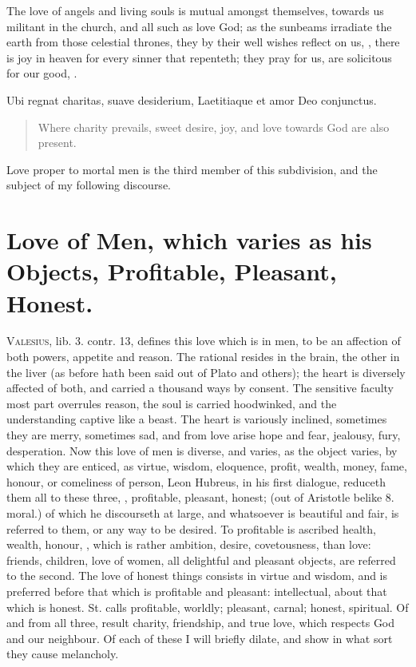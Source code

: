 {The love of angels and living souls is mutual amongst themselves,
towards us militant in the church, and all such as love God; as the
sunbeams irradiate the earth from those celestial thrones, they by
their well wishes reflect on us, , there is joy in heaven for every
sinner that repenteth; they pray for us, are solicitous for our good,
.

\begin{latin}
Ubi regnat charitas, suave desiderium,
Laetitiaque et amor Deo conjunctus.
\end{latin}
\translationrule%
\begin{verse}%
Where charity prevails, sweet desire,
joy, and love towards God are also present.
\end{verse}%

Love proper to mortal men is the third member of this subdivision, and
the subject of my following discourse.

\section[Love of Men]{Love of Men, which varies as his Objects, Profitable, Pleasant, Honest.}

\lettrine{V}{alesius}, lib. 3. contr. 13, defines this love which is in men, to be
an affection of both powers, appetite and reason. The rational
resides in the brain, the other in the liver (as before hath been said
out of Plato and others); the heart is diversely affected of both, and
carried a thousand ways by consent. The sensitive faculty most part
overrules reason, the soul is carried hoodwinked, and the understanding
captive like a beast. The heart is variously inclined, sometimes
they are merry, sometimes sad, and from love arise hope and fear,
jealousy, fury, desperation. Now this love of men is diverse, and
varies, as the object varies, by which they are enticed, as virtue,
wisdom, eloquence, profit, wealth, money, fame, honour, or comeliness
of person, \etc{} Leon Hubreus, in his first dialogue, reduceth them all
to these three, , profitable, pleasant,
honest; (out of Aristotle belike 8. moral.) of which he discourseth at
large, and whatsoever is beautiful and fair, is referred to them, or
any way to be desired. To profitable is ascribed health, wealth,
honour, \etc{}, which is rather ambition, desire, covetousness, than love:
friends, children, love of women, all delightful and pleasant
objects, are referred to the second. The love of honest things consists
in virtue and wisdom, and is preferred before that which is profitable
and pleasant: intellectual, about that which is honest. St.
\Austin{} calls profitable, worldly; pleasant, carnal; honest, spiritual.
Of and from all three, result charity, friendship, and true love,
which respects God and our neighbour. Of each of these I will briefly
dilate, and show in what sort they cause melancholy.

}
